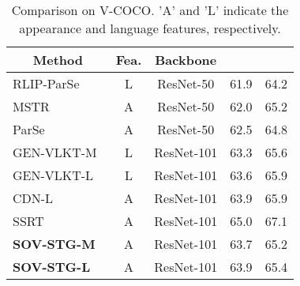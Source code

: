 \documentclass[10pt,twocolumn,letterpaper]{article}
\begin{document}
\begin{table*}[!t]
\begin{minipage}{0.34\linewidth}
{\begin{tabular}{@{}ccccc@{}}
                \hline
                \multicolumn{1}{c|}{Method}                                  & \multicolumn{1}{c|}{Fea.} & \multicolumn{1}{c|}{Backbone} & \multicolumn{1}{c}{} & \multicolumn{1}{c}{}  \\ \hline \hline
\multicolumn{1}{l|}{RLIP-ParSe~\cite{yuan2022rlip}}          & \multicolumn{1}{c|}{L}        & \multicolumn{1}{c|}{ResNet-50}       & 61.9          & 64.2  \\
                \multicolumn{1}{l|}{MSTR~\cite{Kim_2022_CVPR}}               & \multicolumn{1}{c|}{A}        & \multicolumn{1}{c|}{ResNet-50}       & 62.0          & 65.2  \\
\multicolumn{1}{l|}{ParSe~\cite{yuan2022rlip}}               & \multicolumn{1}{c|}{A}        & \multicolumn{1}{c|}{ResNet-50}       & 62.5          & 64.8  \\
                \multicolumn{1}{l|}{GEN-VLKT-M~\cite{liao2022gen}}           & \multicolumn{1}{c|}{L}        & \multicolumn{1}{c|}{ResNet-101}      & 63.3          & 65.6  \\
                \multicolumn{1}{l|}{GEN-VLKT-L~\cite{liao2022gen}}           & \multicolumn{1}{c|}{L}        & \multicolumn{1}{c|}{ResNet-101}      & 63.6          & 65.9  \\
                \multicolumn{1}{l|}{CDN-L~\cite{zhang2021mining}}            & \multicolumn{1}{c|}{A}        & \multicolumn{1}{c|}{ResNet-101}      & 63.9          & 65.9  \\
                \multicolumn{1}{l|}{SSRT~\cite{iftekhar2022look}}            & \multicolumn{1}{c|}{A}        & \multicolumn{1}{c|}{ResNet-101}      & 65.0          & 67.1  \\ \hline
                \multicolumn{1}{l|}{\textbf{SOV-STG-M}}                      & \multicolumn{1}{c|}{A}        & \multicolumn{1}{c|}{ResNet-101}      & 63.7          & 65.2  \\
                \multicolumn{1}{l|}{\textbf{SOV-STG-L}}                      & \multicolumn{1}{c|}{A}        & \multicolumn{1}{c|}{ResNet-101}      & 63.9          & 65.4  \\ 
                \hline
            \end{tabular}
        }
        \caption{Comparison on V-COCO. 'A' and 'L' indicate the appearance and language features, respectively.}
        \label{tab:tab2}
        \vspace{4.3mm}
        \renewcommand\thetable{4}
\end{minipage}
\end{table*}
\end{document}
